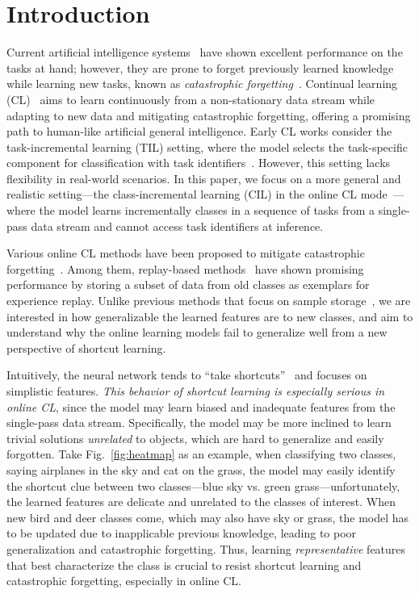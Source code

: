 \section{Introduction}
\label{intro}
Current artificial intelligence systems~\cite{ResNet, DNN, VGG, ViT} have shown excellent performance on the tasks at hand; however, they are prone to forget previously learned knowledge while learning new tasks, known as 
\emph{catastrophic forgetting}~\cite{catastrophic, catastrophic2, EWC}. 
Continual learning (CL)~\cite{survey1, survey2, survey3, CL_CIL1} aims to learn continuously from a non-stationary data stream while adapting to new data and mitigating catastrophic forgetting, offering a promising path to human-like artificial general intelligence.
Early CL works consider the task-incremental learning (TIL) setting, where the model selects the task-specific component for classification with task identifiers~\cite{regular1, kd1, para-iso1, survey3}. However, this setting lacks flexibility in real-world scenarios.
In this paper, we focus on a more general and realistic setting---the class-incremental learning (CIL) in the online CL mode~\cite{online_survey, onlineCL1, onlineCL2, ASER}---where the model learns incrementally classes in a sequence of tasks from a single-pass data stream and cannot access task identifiers at inference.



Various online CL methods have been proposed to mitigate catastrophic forgetting~\cite{ASER, SCR, DVC, online_pro_accum, ER, ER_AML, onlineCL1}. Among them, replay-based methods~\cite{ER,  SCR, OCM, MIR, DVC} have shown promising performance by storing a subset of data from old classes as exemplars for experience replay. 
Unlike previous methods that focus on sample storage~\cite{ASER, GSS},
we are interested in how generalizable the learned features are to new classes, and aim to understand why the online learning models fail to generalize well from a new perspective of shortcut learning.





Intuitively, the neural network tends to ``take shortcuts''~\cite{shortcut} and focuses on simplistic features.
\textit{This behavior of shortcut learning is especially serious in online CL}, since the model may learn biased and inadequate features from the single-pass data stream.
Specifically, the model may be more inclined to learn trivial solutions \emph{unrelated} to objects, which are hard to generalize and easily forgotten. 
Take Fig.~\ref{fig:heatmap} as an example, when classifying two classes, saying airplanes in the sky and cat on the grass, the model may easily identify the shortcut clue between two classes---blue sky vs. green grass---unfortunately, the learned features are delicate and unrelated to the classes of interest. When new bird and deer classes come, which may also have sky or grass, the model has to be updated due to inapplicable previous knowledge, leading to poor generalization and catastrophic forgetting.
Thus, learning \emph{representative} features that best characterize the class is crucial to resist shortcut learning and catastrophic forgetting, especially in online CL.



